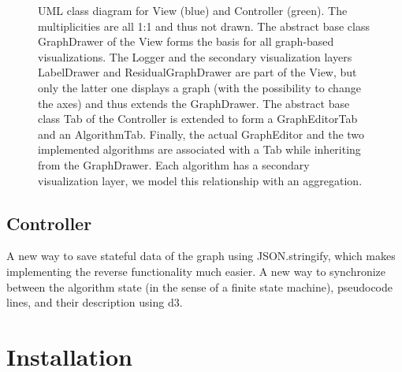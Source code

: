 \begin{figure}[htb!]
\caption{UML class diagram for View (blue) and Controller (green). The multiplicities are all 1:1 and thus not drawn. The abstract base class GraphDrawer of the View forms the basis for all graph-based visualizations. The Logger and the secondary visualization layers LabelDrawer and ResidualGraphDrawer are part of the View, but only the latter one displays a graph (with the possibility to change the axes) and thus extends the GraphDrawer. The abstract base class Tab of the Controller is extended to form a GraphEditorTab and an AlgorithmTab. Finally, the actual GraphEditor and the two implemented algorithms are associated with a Tab while inheriting from the GraphDrawer. Each algorithm has a secondary visualization layer, we model this relationship with an aggregation.}
\label{fig:viewcontroller}
\end{figure}


\subsection{Controller}
	A new way to save stateful data of the graph using JSON.stringify, which makes implementing the reverse functionality much easier. A new way to synchronize between the algorithm state (in the sense of a finite state machine), pseudocode lines, and their description using d3.



\section{Installation}\label{sec:installation}
